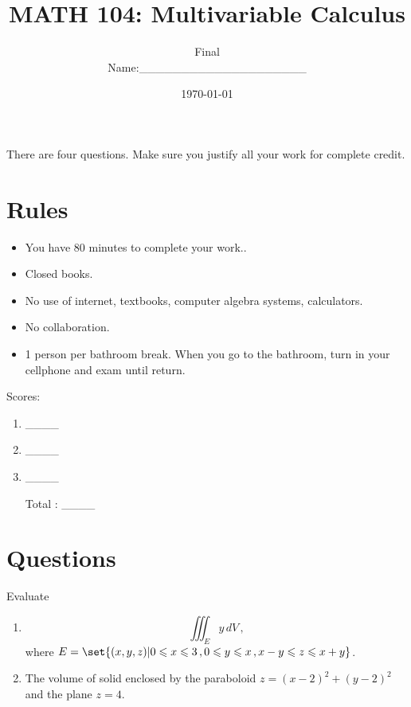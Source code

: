 \documentclass[12pt]{amsart}
\title{ MATH 104: Multivariable Calculus }
\author{Final\\ Name:\_\_\_\_\_\_\_\_\_\_\_\_\_\_\_\_\_\_\_\_}
\date{\today}
\begin{document}
\maketitle

There are four questions. Make sure you justify all your work for complete credit.

\section*{Rules}

\begin{itemize}[leftmargin=*]
	\item You have 80  minutes to complete your work..
	\item Closed books.
	\item No use of internet, textbooks, computer algebra systems, calculators.
	\item No collaboration.
	\item 1 person per bathroom break. When you go to the bathroom, turn in your cellphone and exam until return.
\end{itemize}


Scores:
\begin{enumerate}
	\item \_\_\_\_
	\item \_\_\_\_
	\item \_\_\_\_
	\item[Total]: \_\_\_\_
\end{enumerate}

\newpage

\section*{Questions}
\begin{problem}
Evaluate
\begin{enumerate}
	\item
	      \begin{equation*}
		      \iiint_E y \, dV \,,
	      \end{equation*}
	      where $E = \set{ (x,y,z) | 0 \leq x \leq 3\,, 0\leq y \leq x \,, x - y \leq z \leq x+y  } $.

	      \vspace{8cm}

	\item The volume of solid enclosed by the paraboloid $z = (x-2)^2 + (y-2)^2$ and the plane $ z  = 4$.


\end{enumerate}
\end{problem}
\end{document}
